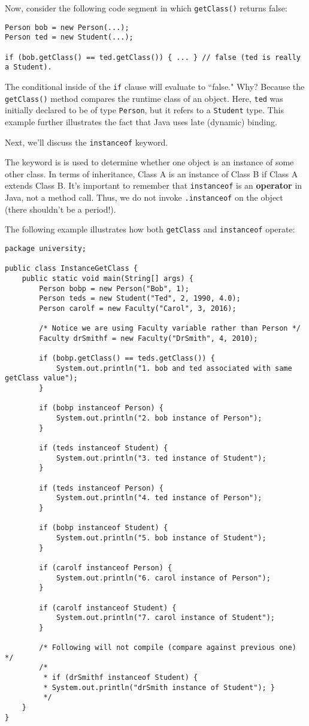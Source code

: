 Now, consider the following code segment in which \verb!getClass()! returns false:

\begin{lstlisting}
Person bob = new Person(...);
Person ted = new Student(...);

if (bob.getClass() == ted.getClass()) { ... } // false (ted is really a Student).
\end{lstlisting}

The conditional inside of the \verb!if! clause will evaluate to ``false." Why? Because the \verb!getClass()! method compares the runtime class of an object. Here, \verb!ted! was initially declared to be of type \verb!Person!, but it refers to a \verb!Student! type. This example further illustrates the fact that Java uses late (dynamic) binding.



Next, we'll discuss the \verb!instanceof! keyword.

The \verb@instanceof@ keyword is is used to determine whether one object is an instance of some other class. In terms of inheritance, Class A is an instance of Class B if Class A extends Class B. It's important to remember that \verb!instanceof! is an \textbf{operator} in Java, not a method call. Thus, we do not invoke \verb!.instanceof! on the object (there shouldn't be a period!).


The following example illustrates how both \verb!getClass! and \verb!instanceof! operate:


\begin{lstlisting}
package university;

public class InstanceGetClass {
	public static void main(String[] args) {
		Person bobp = new Person("Bob", 1);
		Person teds = new Student("Ted", 2, 1990, 4.0);
		Person carolf = new Faculty("Carol", 3, 2016);

		/* Notice we are using Faculty variable rather than Person */
		Faculty drSmithf = new Faculty("DrSmith", 4, 2010);

		if (bobp.getClass() == teds.getClass()) {
			System.out.println("1. bob and ted associated with same getClass value");
		}

		if (bobp instanceof Person) {
			System.out.println("2. bob instance of Person");
		}

		if (teds instanceof Student) {
			System.out.println("3. ted instance of Student");
		}

		if (teds instanceof Person) {
			System.out.println("4. ted instance of Person");
		}

		if (bobp instanceof Student) {
			System.out.println("5. bob instance of Student");
		}

		if (carolf instanceof Person) {
			System.out.println("6. carol instance of Person");
		}

		if (carolf instanceof Student) {
			System.out.println("7. carol instance of Student");
		}

		/* Following will not compile (compare against previous one) */
		/*
		 * if (drSmithf instanceof Student) {
		 * System.out.println("drSmith instance of Student"); }
		 */
	}
}
\end{lstlisting}

